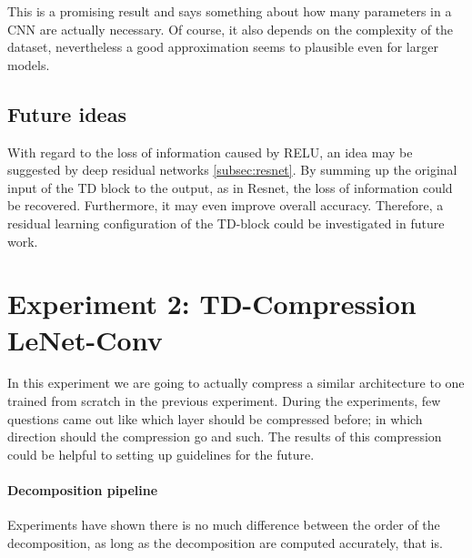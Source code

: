 This is a promising result and says something about how many parameters in a CNN are actually necessary. Of course, it also depends on the complexity of the dataset, nevertheless a good approximation seems to plausible even for larger models. 


\subsection{Future ideas}
With regard to the loss of information caused by RELU, an idea may be suggested by deep residual networks \ref{subsec:resnet}. By summing up the original input of the TD block to the output, as in Resnet, the loss of information could be recovered. Furthermore, it may even improve overall accuracy. Therefore, a residual learning configuration of the TD-block could be investigated in future work. 

\section{Experiment 2: TD-Compression LeNet-Conv}
In this experiment we are going to actually compress a similar architecture to one trained from scratch in the previous experiment. During the experiments, few questions came out like which layer should be compressed before; in which direction should the compression go and such. The results of this compression could be helpful to setting up guidelines for the future. 


\paragraph{Decomposition pipeline}
Experiments have shown there is no much difference between the order of the decomposition, as long as the decomposition are computed accurately, that is. \\

